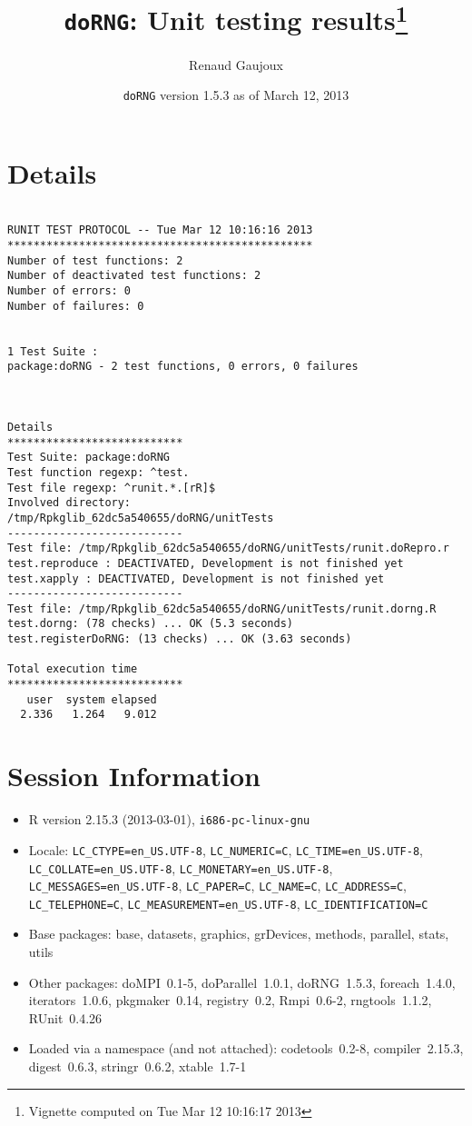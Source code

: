\documentclass[10pt]{article}
\author{Renaud Gaujoux}
\title{\texttt{doRNG}: Unit testing results\footnote{Vignette computed  on Tue Mar 12 10:16:17 2013}}
\date{\texttt{doRNG} version 1.5.3 as of March 12, 2013}
\begin{document}
\maketitle

\section{Details}
\begin{verbatim}

RUNIT TEST PROTOCOL -- Tue Mar 12 10:16:16 2013 
*********************************************** 
Number of test functions: 2 
Number of deactivated test functions: 2 
Number of errors: 0 
Number of failures: 0 

 
1 Test Suite : 
package:doRNG - 2 test functions, 0 errors, 0 failures



Details 
*************************** 
Test Suite: package:doRNG 
Test function regexp: ^test. 
Test file regexp: ^runit.*.[rR]$ 
Involved directory: 
/tmp/Rpkglib_62dc5a540655/doRNG/unitTests 
--------------------------- 
Test file: /tmp/Rpkglib_62dc5a540655/doRNG/unitTests/runit.doRepro.r 
test.reproduce : DEACTIVATED, Development is not finished yet
test.xapply : DEACTIVATED, Development is not finished yet
--------------------------- 
Test file: /tmp/Rpkglib_62dc5a540655/doRNG/unitTests/runit.dorng.R 
test.dorng: (78 checks) ... OK (5.3 seconds)
test.registerDoRNG: (13 checks) ... OK (3.63 seconds)

Total execution time
***************************
   user  system elapsed 
  2.336   1.264   9.012 

\end{verbatim}

\section*{Session Information}
\begin{itemize}\raggedright
  \item R version 2.15.3 (2013-03-01), \verb|i686-pc-linux-gnu|
  \item Locale: \verb|LC_CTYPE=en_US.UTF-8|, \verb|LC_NUMERIC=C|, \verb|LC_TIME=en_US.UTF-8|, \verb|LC_COLLATE=en_US.UTF-8|, \verb|LC_MONETARY=en_US.UTF-8|, \verb|LC_MESSAGES=en_US.UTF-8|, \verb|LC_PAPER=C|, \verb|LC_NAME=C|, \verb|LC_ADDRESS=C|, \verb|LC_TELEPHONE=C|, \verb|LC_MEASUREMENT=en_US.UTF-8|, \verb|LC_IDENTIFICATION=C|
  \item Base packages: base, datasets, graphics, grDevices, methods,
    parallel, stats, utils
  \item Other packages: doMPI~0.1-5, doParallel~1.0.1, doRNG~1.5.3,
    foreach~1.4.0, iterators~1.0.6, pkgmaker~0.14, registry~0.2,
    Rmpi~0.6-2, rngtools~1.1.2, RUnit~0.4.26
  \item Loaded via a namespace (and not attached): codetools~0.2-8,
    compiler~2.15.3, digest~0.6.3, stringr~0.6.2, xtable~1.7-1
\end{itemize}
\end{document}
